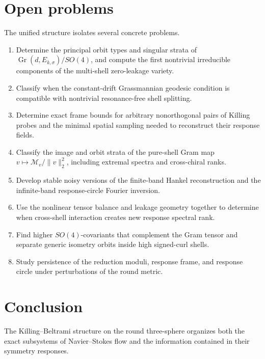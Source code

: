 \documentclass[
 aps,
 prd,
 reprint,
 amsmath,
 amssymb,
 nofootinbib,
 superscriptaddress
]{revtex4-2}
\theoremstyle{definition}
\theoremstyle{remark}
\newcommand{\Gr}{\operatorname{Gr}}
\begin{document}
\section{Open problems}

The unified structure isolates several concrete problems.

\begin{enumerate}[label=(\arabic*)]
\item
Determine the principal orbit types and singular strata of
\(\Gr(d,E_{k,\sigma})/SO(4)\), and compute the first nontrivial irreducible
components of the multi-shell zero-leakage variety.

\item
Classify when the constant-drift Grassmannian geodesic condition is
compatible with nontrivial resonance-free shell splitting.

\item
Determine exact frame bounds for arbitrary nonorthogonal pairs of Killing
probes and the minimal spatial sampling needed to reconstruct their response
fields.

\item
Classify the image and orbit strata of the pure-shell Gram map
\(v\mapsto\mathscr M_v/\|v\|_2^2\), including extremal spectra and
cross-chiral ranks.

\item
Develop stable noisy versions of the finite-band Hankel reconstruction and
the infinite-band response-circle Fourier inversion.

\item
Use the nonlinear tensor balance and leakage geometry together to determine
when cross-shell interaction creates new response spectral rank.

\item
Find higher \(SO(4)\)-covariants that complement the Gram tensor and
separate generic isometry orbits inside high signed-curl shells.

\item
Study persistence of the reduction moduli, response frame, and response
circle under perturbations of the round metric.
\end{enumerate}

\section{Conclusion}

The Killing--Beltrami structure on the round three-sphere organizes both the
exact subsystems of Navier--Stokes flow and the information contained in
their symmetry responses.
\end{document}
